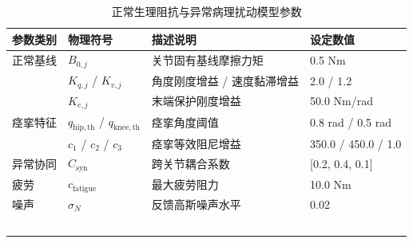 \begin{table}[htbp]
\centering
\caption{正常生理阻抗与异常病理扰动模型参数}
\begin{tabular}{lllp{4cm}}
\toprule
参数类别 & 物理符号 & 描述说明 & 设定数值 \\
\midrule
正常基线 & $B_{0,j}$ & 关节固有基线摩擦力矩 & 0.5 Nm \\
 & $K_{q,j}$ / $K_{v,j}$ & 角度刚度增益 / 速度黏滞增益 & 2.0 / 1.2 \\
 & $K_{e,j}$ & 末端保护刚度增益 & 50.0 Nm/rad \\
痉挛特征 & $q_{\mathrm{hip,th}}$ / $q_{\mathrm{knee,th}}$ & 痉挛角度阈值 & 0.8 rad / 0.5 rad \\
 & $c_1$ / $c_2$ / $c_3$ & 痉挛等效阻尼增益 & 350.0 / 450.0 / 1.0 \\
异常协同 & $C_{\mathrm{syn}}$ & 跨关节耦合系数 & [0.2, 0.4, 0.1] \\
疲劳 & $c_{\mathrm{fatigue}}$ & 最大疲劳阻力 & 10.0 Nm \\
噪声 & $\sigma_N$ & 反馈高斯噪声水平 & 0.02 \\
 &  &  &  \\
 &  &  &  \\
 &  &  &  \\
 &  &  &  \\
 &  &  &  \\
\bottomrule
\end{tabular}
\end{table}
